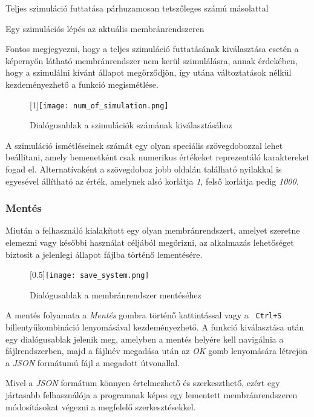 \begin{compactenum}
\item Teljes szimuláció futtatása párhuzamosan tetszőleges számú másolattal 
\item Egy szimulációs lépés az aktuális membránrendszeren
\end{compactenum}

Fontos megjegyezni, hogy a teljes szimuláció futtatásának kiválasztása esetén a képernyőn látható membránrendszer nem kerül szimulálásra, annak érdekében, hogy a szimulálni kívánt állapot megőrződjön, így utána változtatások nélkül kezdeményezhető a funkció megismétlése.

\begin{figure}[H]
	\centering
	\scalebox{1}[1]{\texttt{[image: num\_of\_simulation.png]}}
	\caption{Dialógusablak a szimulációk számának kiválasztásához}
	\label{fig:num_of_sim}
\end{figure}

A szimuláció ismétléseinek számát egy olyan speciális szövegdobozzal lehet beállítani, amely bemenetként csak numerikus értékeket reprezentáló karaktereket fogad el. Alternatívaként a szövegdoboz jobb oldalán található nyilakkal is egyesével állítható az érték, amelynek alsó korlátja \textit{1}, felső korlátja pedig \textit{1000}.
 
\subsubsection{Mentés}
Miután a felhasználó kialakított egy olyan membránrendszert, amelyet szeretne elemezni vagy későbbi használat céljából megőrizni, az alkalmazás lehetőséget biztosít a jelenlegi állapot fájlba történő lementésére.

\begin{figure}[H]
	\centering
	\scalebox{0.5}[0.5]{\texttt{[image: save\_system.png]}}
	\caption{Dialógusablak a membránrendszer mentéséhez}
	\label{fig:save_system}
\end{figure}

A mentés folyamata a \textit{Mentés} gombra történő kattintással vagy a \verb| Ctrl+S| billentyűkombináció lenyomásával kezdeményezhető. A funkció kiválasztása után egy dialógusablak jelenik meg, amelyben a mentés helyére kell navigálnia a fájlrendszerben, majd a fájlnév megadása után az \textit{OK} gomb lenyomására létrejön a \textit{JSON} formátumú fájl a megadott útvonallal.

Mivel a \textit{JSON} formátum könnyen értelmezhető és szerkeszthető, ezért egy jártasabb felhasználója a programnak képes egy lementett membránrendszeren módosításokat végezni a megfelelő szerkesztésekkel. 


